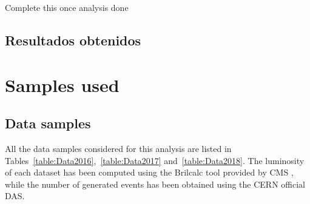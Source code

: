 \documentclass[a4paper, 10pt, openright]{report}
\begin{document}
\begin{appendices}
\color{red} Complete this once analysis done \color{black}

\section{Resultados obtenidos}







\chapter{Samples used} \label{appendix:Samples}
\section{Data samples} \label{appendix:DataSamples}

All the data samples considered for this analysis are listed in Tables~\ref{table:Data2016},~\ref{table:Data2017} and~\ref{table:Data2018}. The luminosity of each dataset has been computed using the Brilcalc tool provided by \ac{CMS} \cite{Brilcalc}, while the number of generated events has been obtained using the CERN official \acf{DAS}.


\end{appendices}
\end{document}

